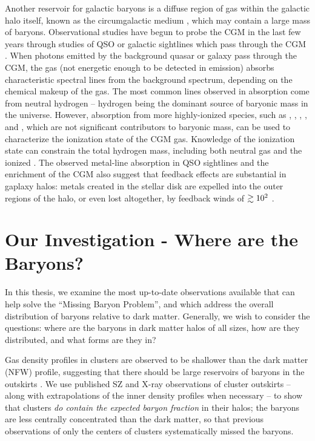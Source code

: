 Another reservoir for galactic baryons is a diffuse region of gas
within the galactic halo itself, known as the circumgalactic medium
\citep[CGM][]{Bahcall1969, Bergeron1985, Lanzetta1995}, which may
contain a large mass of baryons. Observational studies have begun to
probe the CGM in the last few years through studies of QSO or galactic
sightlines which pass through the CGM \citep{Steidel2010,
  Prochaska2011, Tumlinson2011, Werk2013}. When photons emitted by the
background quasar or galaxy pass through the CGM, the gas (not
energetic enough to be detected in emission) absorbs characteristic
spectral lines from the background spectrum, depending on the chemical
makeup of the gas. The most common lines observed in absorption come
from neutral hydrogen -- hydrogen being the dominant source of
baryonic mass in the universe. However, absorption from more
highly-ionized species, such as  \citep{Zhu2013},
, , , and 
\citep{Tumlinson2011, Werk2014}, which are not significant
contributors to baryonic mass, can be used to characterize the
ionization state of the CGM gas. Knowledge of the ionization state can
constrain the total hydrogen mass, including both neutral 
gas and the ionized . The observed metal-line absorption in
QSO sightlines and the enrichment of the CGM also suggest that
feedback effects are substantial in gaplaxy halos: metals created in
the stellar disk are expelled into the outer regions of the halo, or
even lost altogether, by feedback winds of $\gtrsim 10^2$ \kms{}
\citep{D'Odorico1991, Chen2010, Oppenheimer2012, Booth2012}.

\section{Our Investigation - Where are the Baryons?}
\label{sec:investigation}

In this thesis, we examine the most up-to-date observations available
that can help solve the ``Missing Baryon Problem'', and which address
the overall distribution of baryons relative to dark
matter. Generally, we wish to consider the questions: where are the
baryons in dark matter halos of all sizes, how are they distributed,
and what forms are they in? 

Gas density profiles in clusters are observed to be shallower than the
dark matter (NFW) profile, suggesting that there should be large
reservoirs of baryons in the outskirts . We use
published SZ and X-ray observations of cluster outskirts -- along with
extrapolations of the inner density profiles when necessary -- to show
that clusters \textit{do contain the expected baryon fraction} in
their halos; the baryons are less centrally concentrated than the dark
matter, so that previous observations of only the centers of clusters
systematically missed the baryons.

